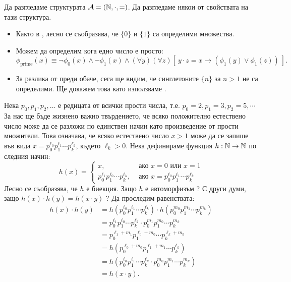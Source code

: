 \begin{example}
  Да разгледаме структурата $\mathcal{A} = (\mathbb{N}, \cdot ,=)$. Да разгледаме някои от свойствата на тази структура.
  \begin{itemize}
  \item
    Както в , лесно се съобразява, че $\{0\}$ и $\{1\}$ са определими множества.
  \item
    Можем да определим кога едно число е просто:
    \[\phi_{\text{prime}}(x) \equiv \neg \phi_0(x) \land \neg \phi_1(x) \land (\forall y)(\forall z)[\ y \cdot z = x \to (\phi_1(y) \lor \phi_1(z))\ ].\]
  \item
    За разлика от преди обаче, сега ще видим, че синглетоните $\{n\}$ за $n > 1$ не са определими.
    Ще докажем това като използваме .
  \end{itemize}
  
  

  Нека $p_0,p_1,p_2,\dots$ е редицата от всички прости числа, т.е. $p_0 = 2, p_1 = 3, p_2 = 5, \cdots$
  За нас ще бъде жизнено важно твърдението, че всяко положително естествено число може да се разложи по единствен начин
  като произведение от прости множители. Това означава, че всяко естествено число $x > 1$ може да се запише във вида
  $x = p^{\ell_0}_0p^{\ell_1}_1\cdots p^{\ell_k}_k$, където $\ell_k > 0$.
  Нека дефинираме функция $h:\mathbb{N} \to \mathbb{N}$ по следния начин:
  \[h(x) =
    \begin{cases}
      x, & \text{ ако }x = 0 \text{ или } x = 1\\
      p^{\ell_1}_0p^{\ell_0}_1\cdots p^{\ell_k}_k, & \text{ ако }x = p^{\ell_0}_0 p^{\ell_1}_1 \cdots p^{\ell_k}_k
    \end{cases}\]
  Лесно се съобразява, че $h$ е биекция. Защо $h$ е автоморфизъм ?
  С други думи, защо $h(x) \cdot h(y) = h(x \cdot y)$ ? Да проследим равенствата:  
  \begin{align*}
    h(x) \cdot h(y) & = h(p^{\ell_0}_0 p^{\ell_1}_1\cdots p^{\ell_k}_k) \cdot h(p^{m_0}_0 p^{m_1}_1\cdots p^{m_k}_k)\\
                    & = p^{\ell_1}_0 p^{\ell_0}_1\cdots p^{\ell_k}_k \cdot p^{m_1}_0 p^{m_0}_1\cdots p^{m_k}_k\\
                    & = p^{\ell_1+m_1}_0 p^{\ell_0+m_0}_1\cdots p^{\ell_k+m_k}_k\\
                    & = h(p^{\ell_0+m_0}_0 p^{\ell_1+m_1}_1\cdots p^{\ell_k}_k)\\
                    & = h(p^{\ell_0}_0 p^{\ell_1}_1\cdots p^{\ell_k}_k \cdot p^{m_0}_0 p^{m_1}_1\cdots p^{m_k}_k)\\
                    & = h(x \cdot y).
  \end{align*}


\end{example}
